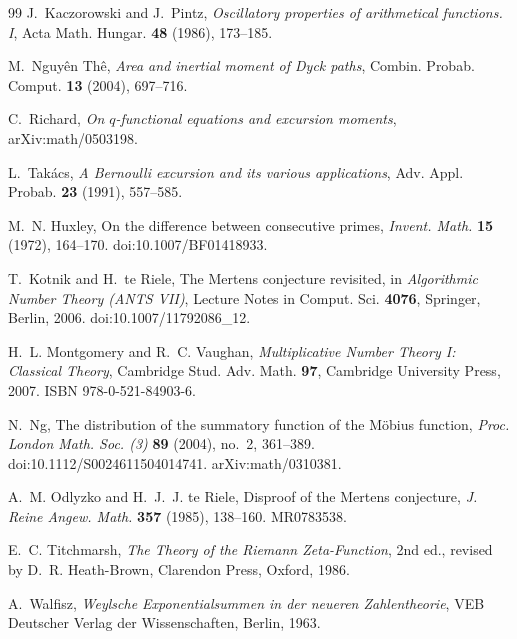 \documentclass[11pt]{amsart}
\numberwithin{equation}{section}
\theoremstyle{plain}
\theoremstyle{definition}
\theoremstyle{remark}
\begin{document}
\begin{thebibliography}{99}
J.~Kaczorowski and J.~Pintz, \emph{Oscillatory properties of arithmetical
functions. I}, Acta Math. Hungar. \textbf{48} (1986), 173--185.

M.~Nguy\^en Th\^e, \emph{Area and inertial moment of Dyck paths}, Combin.
Probab. Comput. \textbf{13} (2004), 697--716.

C.~Richard, \emph{On $q$-functional equations and excursion moments},
arXiv:math/0503198.

L.~Tak\'acs, \emph{A Bernoulli excursion and its various applications},
Adv. Appl. Probab. \textbf{23} (1991), 557--585.

M.~N. Huxley, On the difference between consecutive primes,
\emph{Invent. Math.} \textbf{15} (1972), 164--170.
doi:10.1007/BF01418933.

T.~Kotnik and H.~te Riele, The Mertens conjecture revisited, in
\emph{Algorithmic Number Theory (ANTS VII)}, Lecture Notes in Comput. Sci.
\textbf{4076}, Springer, Berlin, 2006. doi:10.1007/11792086\_12.

H.~L. Montgomery and R.~C. Vaughan, \emph{Multiplicative Number Theory I:
Classical Theory}, Cambridge Stud. Adv. Math. \textbf{97}, Cambridge
University Press, 2007. ISBN 978-0-521-84903-6.

N.~Ng, The distribution of the summatory function of the Möbius function,
\emph{Proc. London Math. Soc. (3)} \textbf{89} (2004), no.~2, 361--389.
doi:10.1112/S0024611504014741. arXiv:math/0310381.

A.~M. Odlyzko and H.~J.~J. te Riele, Disproof of the Mertens conjecture,
\emph{J. Reine Angew. Math.} \textbf{357} (1985), 138--160. MR0783538.

E.~C. Titchmarsh, \emph{The Theory of the Riemann Zeta-Function}, 2nd ed.,
revised by D.~R. Heath-Brown, Clarendon Press, Oxford, 1986.

A.~Walfisz, \emph{Weylsche Exponentialsummen in der neueren Zahlentheorie},
VEB Deutscher Verlag der Wissenschaften, Berlin, 1963.

\end{thebibliography}
\end{document}
